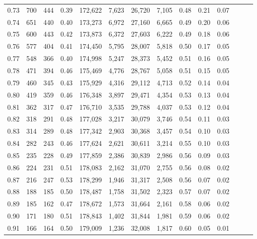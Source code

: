\begin{tabular}{rrrrrrrrrrrrrr}
0.73 &    700 &  444 &  0.39 &  172,622 &    7,623 &  26,720 &   7,105 &  0.48 &  0.21 &      0.07 \\
0.74 &    651 &  440 &  0.40 &  173,273 &    6,972 &  27,160 &   6,665 &  0.49 &  0.20 &      0.06 \\
0.75 &    600 &  443 &  0.42 &  173,873 &    6,372 &  27,603 &   6,222 &  0.49 &  0.18 &      0.06 \\
0.76 &    577 &  404 &  0.41 &  174,450 &    5,795 &  28,007 &   5,818 &  0.50 &  0.17 &      0.05 \\
0.77 &    548 &  366 &  0.40 &  174,998 &    5,247 &  28,373 &   5,452 &  0.51 &  0.16 &      0.05 \\
0.78 &    471 &  394 &  0.46 &  175,469 &    4,776 &  28,767 &   5,058 &  0.51 &  0.15 &      0.05 \\
0.79 &    460 &  345 &  0.43 &  175,929 &    4,316 &  29,112 &   4,713 &  0.52 &  0.14 &      0.04 \\
0.80 &    419 &  359 &  0.46 &  176,348 &    3,897 &  29,471 &   4,354 &  0.53 &  0.13 &      0.04 \\
0.81 &    362 &  317 &  0.47 &  176,710 &    3,535 &  29,788 &   4,037 &  0.53 &  0.12 &      0.04 \\
0.82 &    318 &  291 &  0.48 &  177,028 &    3,217 &  30,079 &   3,746 &  0.54 &  0.11 &      0.03 \\
0.83 &    314 &  289 &  0.48 &  177,342 &    2,903 &  30,368 &   3,457 &  0.54 &  0.10 &      0.03 \\
0.84 &    282 &  243 &  0.46 &  177,624 &    2,621 &  30,611 &   3,214 &  0.55 &  0.10 &      0.03 \\
0.85 &    235 &  228 &  0.49 &  177,859 &    2,386 &  30,839 &   2,986 &  0.56 &  0.09 &      0.03 \\
0.86 &    224 &  231 &  0.51 &  178,083 &    2,162 &  31,070 &   2,755 &  0.56 &  0.08 &      0.02 \\
0.87 &    216 &  247 &  0.53 &  178,299 &    1,946 &  31,317 &   2,508 &  0.56 &  0.07 &      0.02 \\
0.88 &    188 &  185 &  0.50 &  178,487 &    1,758 &  31,502 &   2,323 &  0.57 &  0.07 &      0.02 \\
0.89 &    185 &  162 &  0.47 &  178,672 &    1,573 &  31,664 &   2,161 &  0.58 &  0.06 &      0.02 \\
0.90 &    171 &  180 &  0.51 &  178,843 &    1,402 &  31,844 &   1,981 &  0.59 &  0.06 &      0.02 \\
0.91 &    166 &  164 &  0.50 &  179,009 &    1,236 &  32,008 &   1,817 &  0.60 &  0.05 &      0.01 \\

\end{tabular}
